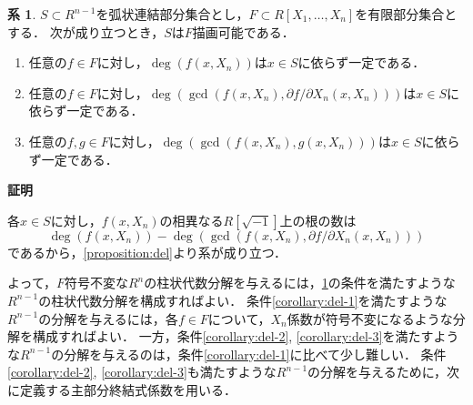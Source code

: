 \documentclass[uplatex, dvipdfmx]{jsarticle}
\makeatletter
\numberwithin{equation}{section}
\renewenvironment{proof}[1][\proofname]{\par
  \pushQED{\qed}%
  \normalfont \topsep6\p@\@plus6\p@\relax
  \trivlist
  \item\relax
  {\bfseries
  #1\@addpunct{.}}\hspace\labelsep\ignorespaces
}{
  \popQED\endtrivlist\@endpefalse
}
\theoremstyle{definition}
\newtheorem{corollary}[definition]{系}
\renewcommand{\proofname}{\textbf{証明}}
\makeatother
\begin{document}
\begin{corollary}\label{corollary:del}
     $S \subset R^{n-1}$を弧状連結部分集合とし，$F \subset R[X_1,\dots, X_n]$を有限部分集合とする．
     次が成り立つとき，$S$は$F$描画可能である．
     \begin{enumerate}
          \item \label{corollary:del-1}
          任意の$f \in F$に対し，$\deg(f(x, X_n))$は$x \in S$に依らず一定である．
          \item \label{corollary:del-2}
          任意の$f \in F$に対し，$\deg(\gcd(f(x, X_n), \partial f/ \partial X_n(x, X_n)))$は$x \in S$に依らず一定である．
          \item \label{corollary:del-3}
          任意の$f, g \in F$に対し，$\deg(\gcd(f(x, X_n), g(x, X_n)))$は$x \in S$に依らず一定である．
     \end{enumerate}
\end{corollary}

\begin{proof}
     各$x \in S$に対し，$f(x, X_n)$の相異なる$R[\sqrt{-1}]$上の根の数は
     \begin{equation}
          \deg(f(x, X_n)) - \deg(\gcd(f(x, X_n), \partial f/ \partial X_n(x, X_n)))
     \end{equation}
     であるから，\cref{proposition:del}より系が成り立つ．
\end{proof}

よって，$F$符号不変な$R^n$の柱状代数分解を与えるには，\cref{corollary:del}の条件を満たすような$R^{n-1}$の柱状代数分解を構成すればよい．
条件\ref{corollary:del-1}を満たすような$R^{n-1}$の分解を与えるには，各$f \in F$について，$X_n$係数が符号不変になるような分解を構成すればよい．
一方，条件\ref{corollary:del-2}, \ref{corollary:del-3}を満たすような$R^{n-1}$の分解を与えるのは，条件\ref{corollary:del-1}に比べて少し難しい．
条件\ref{corollary:del-2}, \ref{corollary:del-3}も満たすような$R^{n-1}$の分解を与えるために，次に定義する主部分終結式係数を用いる．
\end{document}
